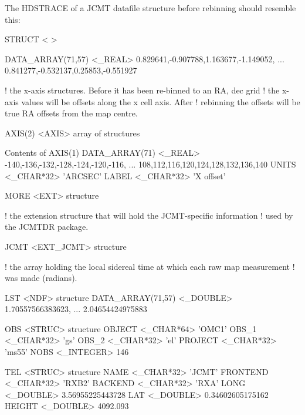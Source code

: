 \documentclass[twoside,11pt,nolof]{starlink}
\begin{document}
\goodbreak

The HDSTRACE of a JCMT datafile structure before rebinning should
resemble this:
\begin{small}
\begin{terminalv}
STRUCT  < >

   DATA_ARRAY(71,57)  <_REAL>     0.829641,-0.907788,1.163677,-1.149052,
                                  ... 0.841277,-0.532137,0.25853,-0.551927

! the x-axis structures. Before it has been re-binned to an RA, dec grid
! the x-axis values will be offsets along the x cell axis. After
! rebinning the offsets will be true RA offsets from the map centre.

   AXIS(2)        <AXIS>          {array of structures}

   Contents of AXIS(1)
      DATA_ARRAY(71)  <_REAL>        -140,-136,-132,-128,-124,-120,-116,
                                     ... 108,112,116,120,124,128,132,136,140
      UNITS          <_CHAR*32>      'ARCSEC'
      LABEL          <_CHAR*32>      'X offset'

   MORE           <EXT>           {structure}

! the extension structure that will hold the JCMT-specific information
! used by the JCMTDR package.

      JCMT           <EXT_JCMT>      {structure}

! the array holding the local sidereal time at which each raw map measurement
! was made (radians).

         LST            <NDF>           {structure}
            DATA_ARRAY(71,57)  <_DOUBLE>   1.70557566383623,
                                           ... 2.04654424975883

         OBS            <STRUC>         {structure}
            OBJECT         <_CHAR*64>      'OMC1'
            OBS_1          <_CHAR*32>      'gs'
            OBS_2          <_CHAR*32>      'el'
            PROJECT        <_CHAR*32>      'ms55'
            NOBS           <_INTEGER>      146

         TEL            <STRUC>         {structure}
            NAME           <_CHAR*32>      'JCMT'
            FRONTEND       <_CHAR*32>      'RXB2'
            BACKEND        <_CHAR*32>      'RXA'
            LONG           <_DOUBLE>       3.56955225443728
            LAT            <_DOUBLE>       0.34602605175162
            HEIGHT         <_DOUBLE>       4092.093


\end{terminalv}
\end{small}
\end{document}
